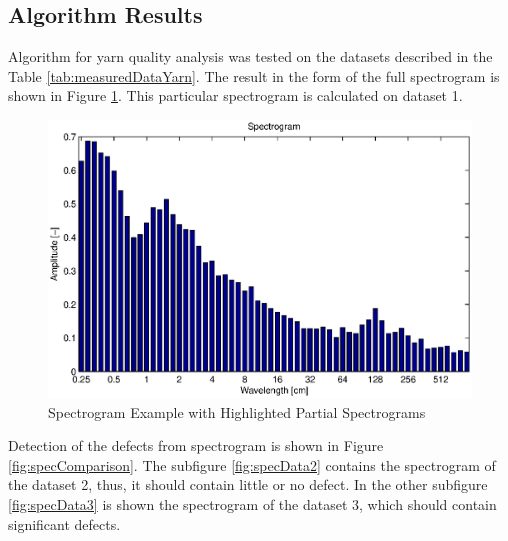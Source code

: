 \documentclass[twoside]{ctuthesis}
\theoremstyle{plain}
\theoremstyle{definition}
\theoremstyle{note}
\begin{document}
\subsection{Algorithm Results}
Algorithm for yarn quality analysis was tested on the datasets described in the Table \ref{tab:measuredDataYarn}. The result in the form of the full spectrogram is shown in Figure \ref{fig:yarnSpec_1}. This particular spectrogram is calculated on dataset 1.

\begin{figure}[h]
	\centering
	\includegraphics[width=1.0\textwidth]{prize4.eps}
	\caption{Spectrogram Example with Highlighted Partial Spectrograms}
	\label{fig:yarnSpec_1}
\end{figure}
Detection of the defects from spectrogram is shown in Figure \ref{fig:specComparison}. The subfigure \ref{fig:specData2} contains the spectrogram of the dataset 2, thus, it should contain little or no defect. In the other subfigure \ref{fig:specData3} is shown the spectrogram of the dataset 3, which should contain significant defects.
\end{document}
